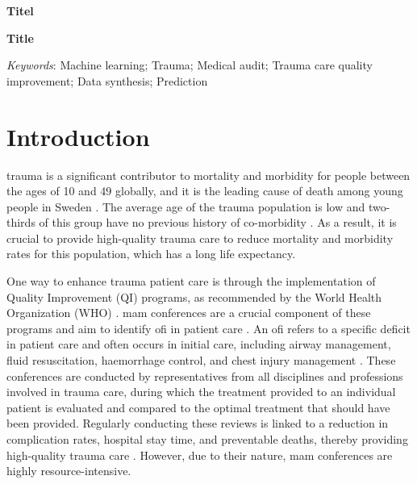 \documentclass[12pt, letterpaper]{article}
\begin{document}

\begin{titlepage}
    
\end{titlepage}


\textbf{Titel}

\vfill

\textbf{Title}

\vfill

\textit{Keywords}: Machine learning; Trauma; Medical audit; Trauma care quality improvement; Data synthesis; Prediction

\newpage

\glsaddall
\printnoidxglossary[type=acronym,style=csuper]
\printnoidxglossary[style=gsuper]

\newpage
{}


\section{Introduction}
\Gls{trauma} is a significant contributor to mortality and morbidity for people between the ages of 10 and 49 globally, and it is the leading cause of death among young people in Sweden \cite{roth_global_2018, vos_global_2020, sos_death_2021}. The average age of the trauma population is low and two-thirds of this group have no previous history of co-morbidity \cite{brattstrom_socio-economic_2015}. As a result, it is crucial to provide high-quality trauma care to reduce mortality and morbidity rates for this population, which has a long life expectancy.

One way to enhance trauma patient care is through the implementation of Quality Improvement (QI) programs, as recommended by the World Health Organization (WHO) \cite{world_health_organization_guidelines_2009}. \Acrfull{mam}  conferences are a crucial component of these programs and aim to identify \acrfull{ofi} in patient care \cite{santana_development_2014}. An \acrshort{ofi} refers to a specific deficit in patient care and often occurs in initial care, including airway management, fluid resuscitation, haemorrhage control, and chest injury management \cite{world_health_organization_guidelines_2009,roy_learning_2017,oreilly_opportunities_2013,sanddal_analysis_2011}. These conferences are conducted by representatives from all disciplines and professions involved in trauma care, during which the treatment provided to an individual patient is evaluated and compared to the optimal treatment that should have been provided. Regularly conducting these reviews is linked to a reduction in complication rates, hospital stay time, and preventable deaths, thereby providing high-quality trauma care \cite{stelfox_evidence_2011, mcdermott_trauma_1994}.  However, due to their nature, \acrshort{mam} conferences are highly resource-intensive.
\end{document}
